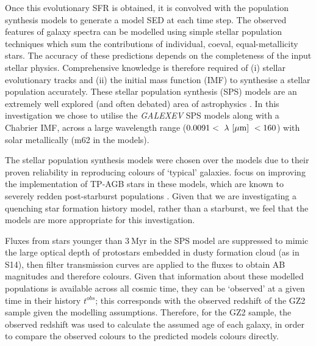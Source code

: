 \documentclass[useAMS,usenatbib]{mn2e}
\def\changed    {\color{titlecol} }
\begin{document}
Once this evolutionary SFR is obtained, it is convolved with the \citet{BC03} population synthesis models to generate a model SED at each time step. The observed features of galaxy spectra can be modelled using simple stellar population techniques which sum the contributions of individual, coeval, equal-metallicity stars. The accuracy of these predictions depends on the completeness of the input stellar physics. Comprehensive knowledge is therefore required of (i) stellar evolutionary tracks and (ii) the initial mass function (IMF) to synthesise a stellar population accurately. These stellar population synthesis (SPS) models are an extremely well explored (and often debated) area of astrophysics \citep{Maraston05, Eminian08, CGW09, Falk09, Chen10, Kriek10, MRC11, Mel12}. In this investigation we chose to utilise the \citet{BC03} \emph{GALEXEV} SPS models along with a Chabrier \citep{Chab03} IMF, across a large wavelength range ($0.0091 < ~\lambda~\rm{[\mu m]}~ < 160 $) with solar metallically (m62 in the \citet{BC03} models).

The \citet{BC03} stellar population synthesis models were chosen over the \citet{Maraston05} models due to their proven reliability in reproducing colours of `typical' galaxies. \citet{Maraston05} focus on improving the implementation of TP-AGB stars in these models, which are known to severely redden post-starburst populations \citep{MG07, Kriek10}. Given that we are investigating a quenching star formation history model, rather than a starburst, we feel that the \citet{BC03} models are more appropriate for this investigation. 

Fluxes from stars younger than $3~$Myr in the SPS model are suppressed to mimic the large optical depth of protostars embedded in dusty formation cloud (as in S14), then filter transmission curves are applied to the fluxes to obtain AB magnitudes and therefore colours. %
{\changed Given that information about these modelled populations is available across all cosmic time, they can be `observed' at a given time in their history $t^{obs}$; this corresponds with the observed redshift of the GZ2 sample given the modelling assumptions.} Therefore, for the GZ2 sample, the observed redshift was used to calculate the assumed age of each galaxy, in order to compare the observed colours to the predicted models colours directly. 
\end{document}
